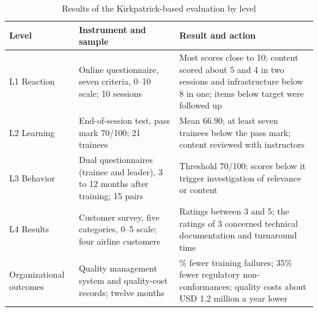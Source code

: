 \begin{table}[H]
  \centering
  \caption{Results of the Kirkpatrick-based evaluation by level}
  \label{tab:results-by-level}
  \footnotesize
  \begin{tabularx}{\linewidth}{@{}>{\raggedright\arraybackslash}p{2.6cm} >{\raggedright\arraybackslash}p{4.2cm} >{\raggedright\arraybackslash}X@{}}
    \toprule
    \textbf{Level} & \textbf{Instrument and sample} & \textbf{Result and action} \\
    \midrule
    L1 Reaction & Online questionnaire, seven criteria, 0--10 scale; 10 sessions & Most scores close to 10; content scored about 5 and 4 in two sessions and infrastructure below 8 in one; items below target were followed up \\
    \addlinespace
    L2 Learning & End-of-session test, pass mark 70/100; 21 trainees & Mean 66.90; at least seven trainees below the pass mark; content reviewed with instructors \\
    \addlinespace
    L3 Behavior & Dual questionnaires (trainee and leader), 3 to 12 months after training; 15 pairs & Threshold 70/100; scores below it trigger investigation of relevance or content \\
    \addlinespace
    L4 Results & Customer survey, five categories, 0--5 scale; four airline customers & Ratings between 3 and 5; the ratings of 3 concerned technical documentation and turnaround time \\
    \addlinespace
    Organizational outcomes & Quality management system and quality-cost records; twelve months & 28\% fewer training failures; 35\% fewer regulatory non-conformances; quality costs about USD 1.2 million a year lower \\
    \bottomrule
  \end{tabularx}
\end{table}
